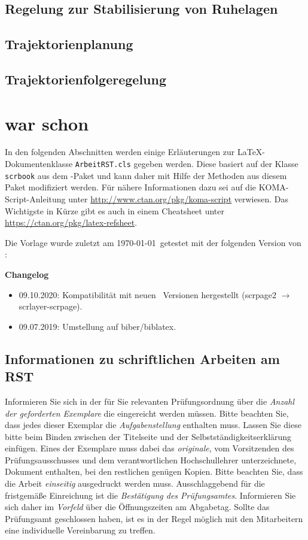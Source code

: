 \section{Regelung zur Stabilisierung von Ruhelagen}

\section{Trajektorienplanung}

\section{Trajektorienfolgeregelung}

\chapter{war schon}
In den folgenden Abschnitten werden einige Erläuterungen zur \LaTeX-Dokumentenklasse \texttt{ArbeitRST.cls} gegeben werden. Diese basiert auf der Klasse \texttt{scrbook} aus dem \KOMAScript-Paket und kann daher mit Hilfe der Methoden aus diesem Paket modifiziert werden. Für nähere Informationen dazu sei auf die KOMA-Script-Anleitung unter \url{http://www.ctan.org/pkg/koma-script} verwiesen. Das Wichtigste in Kürze gibt es auch in einem Cheatsheet unter \url{https://ctan.org/pkg/latex-refsheet}.

Die Vorlage wurde zuletzt am \today~getestet mit der folgenden Version von \KOMAScript: \KOMAScriptVersion 

\textbf{Changelog}
\begin{itemize}
	\item 09.10.2020: Kompatibilität mit neuen \KOMAScript~Versionen hergestellt (scrpage2 $\rightarrow$ scrlayer-scrpage).
	\item 09.07.2019: Umstellung auf biber/biblatex.
\end{itemize}

\section{Informationen zu schriftlichen Arbeiten am RST}
Informieren Sie sich in der für Sie relevanten Prüfungsordnung über die \emph{Anzahl der geforderten Exemplare} die eingereicht werden müssen. Bitte beachten Sie, dass jedes dieser Exemplar die \emph{Aufgabenstellung} enthalten muss. Lassen Sie diese bitte beim Binden zwischen der Titelseite und der Selbstständigkeitserklärung einfügen. Eines der Exemplare muss dabei das \emph{originale}, vom Vorsitzenden des Prüfungsausschusses und dem verantwortlichen Hochschullehrer unterzeichnete, Dokument enthalten, bei den restlichen genügen Kopien. Bitte beachten Sie, dass die Arbeit \emph{einseitig} ausgedruckt werden muss. Ausschlaggebend für die fristgemäße Einreichung ist die \emph{Bestätigung des Prüfungsamtes}. Informieren Sie sich daher im \emph{Vorfeld} über die Öffnungszeiten am Abgabetag. Sollte das Prüfungsamt geschlossen haben, ist es in der Regel möglich mit den Mitarbeitern eine individuelle Vereinbarung zu treffen.


